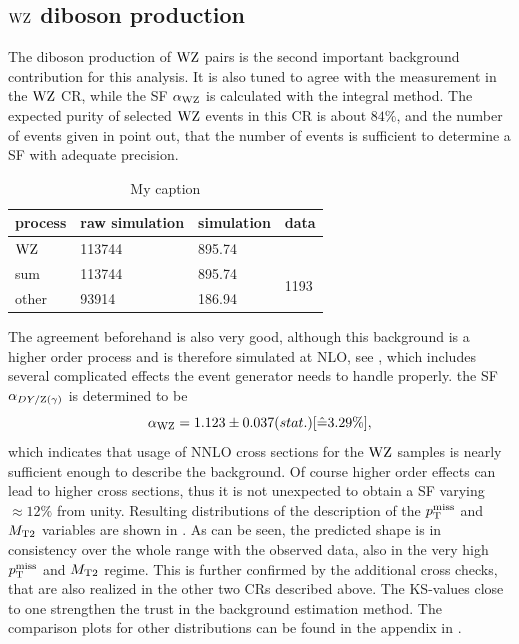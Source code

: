 \subsection{$\mathrm{W}\mathrm{Z}$ diboson production}
The diboson production of $\mathrm{W}\mathrm{Z}$ pairs is the second important background contribution for this analysis. It is also tuned to agree with the measurement in the $\mathrm{W}\mathrm{Z}$ CR, while the SF $\alpha_{\mathrm{W}\mathrm{Z}}$ is calculated with the integral method. The expected purity of selected $\mathrm{W}\mathrm{Z}$ events in this CR is about $84\%$, and the number of events given in  point out, that the number of events is sufficient to determine a SF with adequate precision.
\begin{table}[htb]
 \centering
 \caption{My caption}
 \label{tab:CRWZ}
 \begin{tabular}{llll}
  process  & raw simulation & simulation & data                  \\\hline
  $\mathrm{W}\mathrm{Z}$ & 113744         & 895.74     &                       \\\hline\hline
  sum      & 113744         & 895.74     & \multirow{2}{*}{1193} \\
  other    & 93914          & 186.94     &                       
 \end{tabular}
\end{table}
The agreement beforehand is also very good, although this background is a higher order process and is therefore simulated at NLO, see , which includes several complicated effects the event generator needs to handle properly. the SF $\alpha_{DY/\mathrm{Z}(\gamma)}$ is determined to be
\begin{equation}\label{eq:AlphaWZ}
 \alpha_{\mathrm{W}\mathrm{Z}}=1.123 \pm 0.037 (stat.) [\hat{=}3.29\%],
\end{equation}
which indicates that usage of NNLO cross sections for the $\mathrm{W}\mathrm{Z}$ samples is nearly sufficient enough to describe the background. Of course higher order effects can lead to higher cross sections, thus it is not unexpected to obtain a SF varying $\approx12\%$ from unity. Resulting distributions of the description of the $p_{\mathrm{T}}^\text{miss}$ and $M_{\mathrm{T2}}$ variables are shown in . As can be seen, the predicted shape is in consistency over the whole range with the observed data, also in the very high $p_{\mathrm{T}}^\text{miss}$ and $M_{\mathrm{T2}}$ regime. This is further confirmed by the additional cross checks, that are also realized in the other two CRs described above. The KS-values close to one strengthen the trust in the background estimation method. The comparison plots for other distributions can be found in the appendix in .
